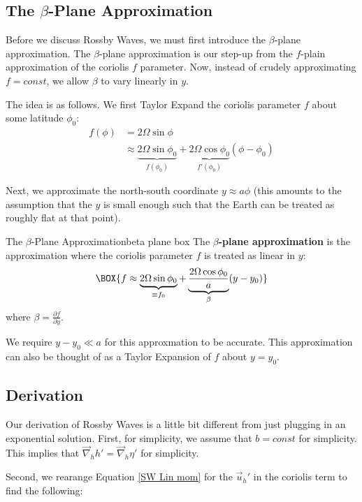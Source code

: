 \subsection{The \texorpdfstring{$\beta$}{Beta}-Plane Approximation}

Before we discuss Rossby Waves, we must first introduce the $\beta$-plane approximation. The $\beta$-plane approximation is our step-up from the $f$-plain approximation of the coriolis $f$ parameter. Now, instead of crudely approximating $f=const$, we allow $\beta$ to vary linearly in $y$.

The idea is as follows. We first Taylor Expand the coriolis parameter $f$ about some latitude $\phi_0$:
\begin{align*}
    f(\phi)&=2\Omega \sin \phi\\
    &\approx \underbrace{2\Omega \sin \phi_0}_{f(\phi_0)}+\underbrace{2\Omega \cos \phi_0}_{f'(\phi_0)} (\phi-\phi_0)
\end{align*}

Next, we approximate the north-south coordinate $y\approx a\phi$ (this amounts to the assumption that the $y$ is small enough such that the Earth can be treated as roughly flat at that point).
\begin{fact}{The $\beta$-Plane Approximation}{beta plane box}\label{beta plane box}
    The \textbf{$\beta$-plane approximation} is the approximation where the coriolis parameter $f$ is treated as linear in $y$:
    \begin{align*}
        \BOX{f\approx \underbrace{2\Omega\sin\phi_0}_{\equiv f_0}+\underbrace{\frac{2\Omega\cos\phi_0}{a}}_{\beta} (y-y_0)}
    \end{align*}
    where $\beta=\frac{\partial f}{\partial y}$.

    We require $y-y_0\ll a$ for this approxmation to be accurate. This approximation can also be thought of as a Taylor Expansion of $f$ about $y=y_0$.
\end{fact}

\subsection{Derivation}

Our derivation of Rossby Waves is a little bit different from just plugging in an exponential solution. First, for simplicity, we assume that $b=const$ for simplicity. This implies that $\vec{\nabla}_h h'=\vec{\nabla}_h \eta'$ for simplicity. 

Second, we rearange Equation \ref{SW Lin mom} for the $\vec{u}_h'$ in the coriolis term to find the following:

